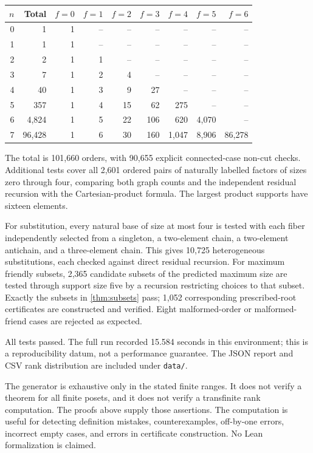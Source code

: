 \documentclass[11pt,letterpaper]{article}
\theoremstyle{definition}
\theoremstyle{remark}
\begin{document}
\begin{center}
\small
\begin{tabular}{r r r r r r r r r}
\toprule
$n$ & Total & $f=0$ & $f=1$ & $f=2$ & $f=3$ & $f=4$ & $f=5$ & $f=6$\\
\midrule
0 & 1 & 1 & -- & -- & -- & -- & -- & --\\
1 & 1 & 1 & -- & -- & -- & -- & -- & --\\
2 & 2 & 1 & 1 & -- & -- & -- & -- & --\\
3 & 7 & 1 & 2 & 4 & -- & -- & -- & --\\
4 & 40 & 1 & 3 & 9 & 27 & -- & -- & --\\
5 & 357 & 1 & 4 & 15 & 62 & 275 & -- & --\\
6 & 4,824 & 1 & 5 & 22 & 106 & 620 & 4,070 & --\\
7 & 96,428 & 1 & 6 & 30 & 160 & 1,047 & 8,906 & 86,278\\
\bottomrule
\end{tabular}
\end{center}
The total is 101,660 orders, with 90,655 explicit connected-case non-cut
checks. Additional tests cover all 2,601 ordered pairs of naturally labelled
factors of sizes zero through four, comparing both graph counts and the
independent residual recursion with the Cartesian-product formula. The
largest product supports have sixteen elements.

For substitution, every natural base of size at most four is tested with
each fiber independently selected from a singleton, a two-element chain,
a two-element antichain, and a three-element chain. This gives 10,725
heterogeneous substitutions, each checked against direct residual recursion.
For maximum friendly subsets, 2,365 candidate subsets of the predicted
maximum size are tested through support size five by a recursion restricting
choices to that subset. Exactly the subsets in \cref{thm:subsets} pass;
1,052 corresponding prescribed-root certificates are constructed and verified.
Eight malformed-order or malformed-friend cases are rejected as expected.

All tests passed. The full run recorded 15.584 seconds in this environment;
this is a reproducibility datum, not a performance guarantee. The JSON
report and CSV rank distribution are included under \texttt{data/}.

The generator is exhaustive only in the stated finite ranges. It does not
verify a theorem for all finite posets, and it does not verify a transfinite
rank computation. The proofs above supply those assertions. The computation
is useful for detecting definition mistakes, counterexamples, off-by-one
errors, incorrect empty cases, and errors in certificate construction.
No Lean formalization is claimed.
\end{document}
